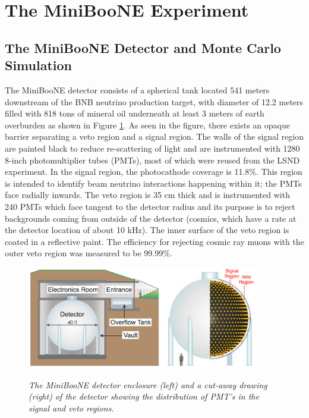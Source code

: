 \section{The MiniBooNE Experiment}

\subsection{The MiniBooNE Detector and Monte Carlo Simulation}



The MiniBooNE detector \cite{MBDetectorPaper} consists of a spherical tank located 541 meters downstream of the BNB neutrino production target, with diameter of 12.2 meters filled with 818 tons of mineral oil underneath at least 3 meters of earth overburden as shown in Figure \ref{MB_detector_fig}. As seen in the figure, there exists an opaque barrier separating a veto region and a signal region. The walls of the signal region are painted black to reduce re-scattering of light and are instrumented with 1280 8-inch photomultiplier tubes (PMTs), most of which were reused from the LSND experiment. In the signal region, the photocathode coverage is 11.8\%. This region is intended to identify beam neutrino interactions happening within it; the PMTs face radially inwards. The veto region is 35 cm thick and is instrumented with 240 PMTs which face tangent to the detector radius and its purpose is to reject backgrounds coming from outside of the detector (cosmics, which have a rate at the detector location of about 10 kHz). The inner surface of the veto region is coated in a reflective paint. The efficiency for rejecting cosmic ray muons with the outer veto region was measured to be 99.99\%.\\

\begin{figure}[ht!]
\centering
	\includegraphics[width=0.9\textwidth]{Figures/MB_detectorpaper_fig.png} \\
\caption{\textit{The MiniBooNE detector enclosure (left) and a cut-away drawing (right) of the detector showing the distribution of PMT's in the signal and veto regions.}}\label{MB_detector_fig}
\end{figure}

